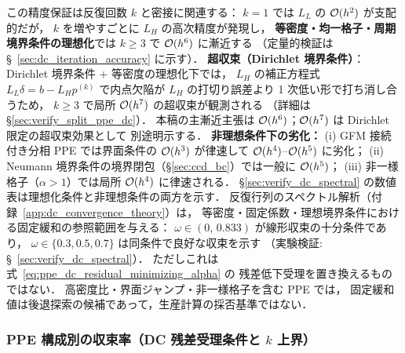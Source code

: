 この精度保証は反復回数 $k$ と密接に関連する：
$k=1$ では $L_L$ の $\mathcal{O}(h^2)$ が支配的だが，
$k$ を増やすごとに $L_H$ の高次精度が発現し，
\textbf{等密度・均一格子・周期境界条件の理想化}では $k \geq 3$ で $\mathcal{O}(h^6)$ に漸近する
（定量的検証は §~\ref{sec:dc_iteration_accuracy} に示す）．
\textbf{超収束（Dirichlet 境界条件）}：
Dirichlet 境界条件 + 等密度の理想化下では，
$L_H$ の補正方程式 $L_L\delta=b-L_H p^{(k)}$ で内点欠陥が
$L_H$ の打切り誤差より 1 次低い形で打ち消し合うため，
$k\geq 3$ で局所 $\mathcal{O}(h^7)$ の超収束が観測される
（詳細は §\ref{sec:verify_split_ppe_dc}）．
本稿の主漸近主張は $\mathcal{O}(h^6)$；$\mathcal{O}(h^7)$ は Dirichlet 限定の超収束効果として
別途明示する．
\textbf{非理想条件下の劣化：}
(i) GFM 接続付き分相 PPE では界面条件の $\mathcal{O}(h^3)$ が律速して
$\mathcal{O}(h^4)$--$\mathcal{O}(h^5)$ に劣化；
(ii) Neumann 境界条件の境界閉包（§\ref{sec:ccd_bc}）では一般に $\mathcal{O}(h^5)$；
(iii) 非一様格子（$\alpha > 1$）では局所 $\mathcal{O}(h^4)$ に律速される．
§\ref{sec:verify_dc_spectral} の数値表は理想化条件と非理想条件の両方を示す．
反復行列のスペクトル解析（付録~\ref{app:dc_convergence_theory}）は，
等密度・固定係数・理想境界条件における固定緩和の参照範囲を与える：
$\omega \in (0,\, 0.833)$ が線形収束の十分条件であり，
$\omega \in \{0.3, 0.5, 0.7\}$ は同条件で良好な収束を示す
（実験検証: §~\ref{sec:verify_dc_spectral}）．
ただしこれは式~\eqref{eq:ppe_dc_residual_minimizing_alpha} の
残差低下受理を置き換えるものではない．
高密度比・界面ジャンプ・非一様格子を含む PPE では，
固定緩和値は後退探索の候補であって，生産計算の採否基準ではない．

\label{sec:dc_comparison}%
\label{sec:dc_pure_fccd_outer_inner}%

\subsubsection{PPE 構成別の収束率（DC 残差受理条件と \texorpdfstring{$k$}{k} 上界）}
\label{sec:dc_pure_fccd_convergence}

